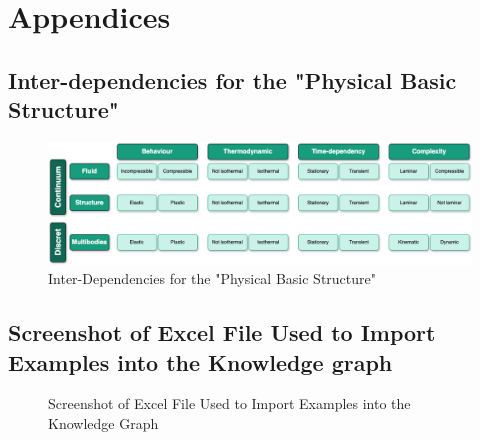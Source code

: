 \appendix

\section*{Appendices}
\renewcommand{\thesubsection}{\Alph{subsection}}

\label{annex:framework}

\subsection{Inter-dependencies for the "Physical Basic Structure" \label{annex:phy-bas-struc}}

\begin{figure}[h]
    \centering
    \includegraphics[width=\textwidth]{images/Concept-PhysicalInterdependencies.drawio.png}
    \caption[Inter-Dependencies for the "Physical Basic Structure"]{\label{fig:phy-bas-struc}  Inter-Dependencies for the "Physical Basic Structure" \cite{assistSim}}
\end{figure}


\subsection{Screenshot of Excel File Used to Import Examples into the Knowledge graph\label{annex:screen-excel}}

\begin{figure}[h]
    \centering
    \caption{\label{fig:screen-excel} Screenshot of Excel File Used to Import Examples into the Knowledge Graph}
\end{figure}



